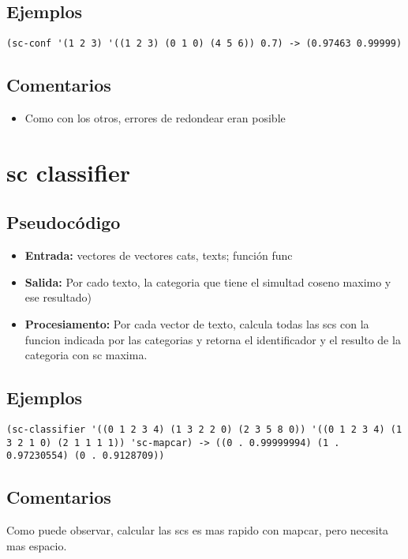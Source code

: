 \documentclass{article}
\begin{document}
\subsection{Ejemplos}
\begin{lstlisting}
(sc-conf '(1 2 3) '((1 2 3) (0 1 0) (4 5 6)) 0.7) -> (0.97463 0.99999)
\end{lstlisting}
\subsection{Comentarios}
\begin{itemize}
	\item Como con los otros, errores de redondear eran posible
\end{itemize}
\section{sc classifier}
\subsection{Pseudoc\'odigo}
\begin{itemize}
	\item \textbf{Entrada:} vectores de vectores cats, texts; funci\'on func
	\item \textbf{Salida:} Por cado texto, la categoria que tiene el simultad coseno maximo y ese resultado)
	\item \textbf{Procesiamento:} Por cada vector de texto, calcula todas las scs con la funcion indicada por las categorias y retorna el identificador y el resulto de la categoria con sc maxima.
\end{itemize}
\subsection{Ejemplos}
\begin{lstlisting}
(sc-classifier '((0 1 2 3 4) (1 3 2 2 0) (2 3 5 8 0)) '((0 1 2 3 4) (1 3 2 1 0) (2 1 1 1 1)) 'sc-mapcar) -> ((0 . 0.99999994) (1 . 0.97230554) (0 . 0.9128709))
\end{lstlisting}
\subsection{Comentarios}
Como puede observar, calcular las scs es mas rapido con mapcar, pero necesita mas espacio.
\end{document}
